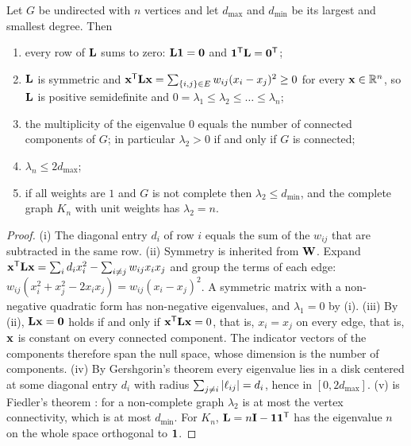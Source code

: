 \begin{proposition}
\label{prop:ch23-laplacian}
Let $G$ be undirected with $n$ vertices and let $d_{\max}$ and $d_{\min}$ be its
largest and smallest degree. Then
\begin{enumerate}[label=(\roman*)]
  \item every row of $\mathbf{L}$ sums to zero: $\mathbf{L}\mathbf{1} = \mathbf{0}$ and
    $\mathbf{1}^{\mathsf{T}} \mathbf{L} = \mathbf{0}^{\mathsf{T}}$;
  \item $\mathbf{L}$ is symmetric and
    $\mathbf{x}^{\mathsf{T}} \mathbf{L} \mathbf{x} = \sum_{\left\{ i,j \right\} \in E} w_{ij} (x_i - x_j)^2 \ge 0$
    for every $\mathbf{x} \in \mathbb{R}^n$, so $\mathbf{L}$ is positive semidefinite and
    $0 = \lambda_1 \le \lambda_2 \le \dots \le \lambda_n$;
  \item the multiplicity of the eigenvalue $0$ equals the number of connected
    components of $G$; in particular $\lambda_2 > 0$ if and only if $G$ is
    connected;
  \item $\lambda_n \le 2 d_{\max}$;
  \item if all weights are $1$ and $G$ is not complete then $\lambda_2 \le d_{\min}$,
    and the complete graph $K_n$ with unit weights has $\lambda_2 = n$.
\end{enumerate}
\end{proposition}
\begin{proof}
(i) The diagonal entry $d_i$ of row $i$ equals the sum of the $w_{ij}$ that are
subtracted in the same row. (ii) Symmetry is inherited from $\mathbf{W}$. Expand
$\mathbf{x}^{\mathsf{T}} \mathbf{L} \mathbf{x} = \sum_i d_i x_i^2 - \sum_{i \ne j} w_{ij} x_i x_j$
and group the terms of each edge: $w_{ij}(x_i^2 + x_j^2 - 2 x_i x_j) =
w_{ij}(x_i - x_j)^2$. A symmetric matrix with a non-negative quadratic form
has non-negative eigenvalues, and $\lambda_1 = 0$ by (i). (iii) By (ii),
$\mathbf{L}\mathbf{x} = \mathbf{0}$ holds if and only if $\mathbf{x}^{\mathsf{T}} \mathbf{L} \mathbf{x} =
0$, that is, $x_i = x_j$ on every edge, that is, $\mathbf{x}$ is constant on
every connected component. The indicator vectors of the components therefore
span the null space, whose dimension is the number of components. (iv) By
Gershgorin's theorem every eigenvalue lies in a disk centered at some diagonal
entry $d_i$ with radius $\sum_{j \ne i} \left\lvert \ell_{ij} \right\rvert = d_i$, hence in
$[0, 2 d_{\max}]$. (v) is Fiedler's theorem \cite{fiedler1973algebraic}: for a
non-complete graph $\lambda_2$ is at most the vertex connectivity, which is at
most $d_{\min}$. For $K_n$, $\mathbf{L} = n\mathbf{I} - \mathbf{1}\mathbf{1}^{\mathsf{T}}$ has the
eigenvalue $n$ on the whole space orthogonal to $\mathbf{1}$.
\end{proof}

